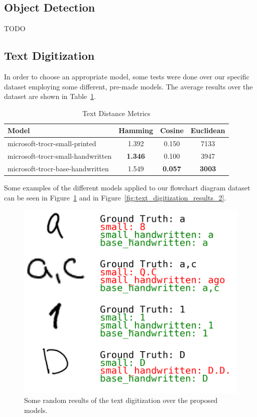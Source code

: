 \documentclass[conference]{IEEEtran}
\begin{document}
\subsection{Object Detection}
TODO

\subsection{Text Digitization}
In order to choose an appropriate model, some tests were done over our specific dataset employing some different, pre-made models. The average results over the dataset are shown in Table~\ref{tab:text_digitization}.

\begin{table}[htbp]
\caption{Text Distance Metrics}
\centering
\begin{tabular}{lccc}
\hline
\textbf{Model} & \textbf{Hamming} & \textbf{Cosine} & \textbf{Euclidean} \\
\hline
microsoft-trocr-small-printed & 1.392 & 0.150 & 7133 \\
microsoft-trocr-small-handwritten & \textbf{1.346} & 0.100  & 3947 \\
microsoft-trocr-base-handwritten & 1.549 & \textbf{0.057} & \textbf{3003} \\
\hline
\end{tabular}
\label{tab:text_digitization}
\end{table}

Some examples of the different models applied to our flowchart diagram dataset can be seen in Figure~\ref{fig:text_digitization_results_1} and in Figure~\ref{fig:text_digitization_results_2}.

\begin{figure}[H]
\centering
\includegraphics[width=\linewidth]{text_digitization_results_1.png}
\caption{Some random results of the text digitization over the proposed models.}
\label{fig:text_digitization_results_1}
\end{figure}
\end{document}
